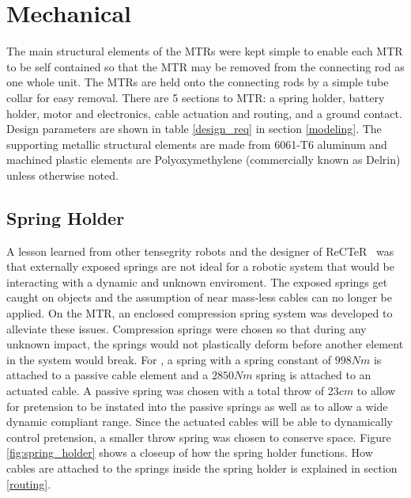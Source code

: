 \section{Mechanical}
The main structural elements of the MTRs were kept simple to  enable  each  MTR  to  be self  contained  so  that  the  MTR  may be removed from the connecting rod as one whole unit.
The MTRs  are  held  onto  the  connecting  rods  by  a  simple tube  collar  for  easy  removal. 
There  are  5  sections  to MTR: a spring holder, battery holder, motor and electronics, cable actuation and routing, and a ground contact. 
Design parameters are shown in table \ref{design_req} in section \ref{modeling}.
The supporting metallic structural elements are made from 6061-T6 aluminum and machined plastic elements are Polyoxymethylene (commercially known as Delrin) unless otherwise noted.

\subsection{Spring Holder}
A  lesson  learned  from other tensegrity robots and the designer of ReCTeR~\cite{Caluwaerts2013rsif} was  that  externally  exposed springs are not ideal for a robotic system that would be interacting with a dynamic and unknown enviroment. 
The exposed springs get caught on objects and the assumption of near mass-less cables  can  no  longer  be  applied.  
On  the  MTR, an enclosed compression spring system was developed  to  alleviate  these  issues.  
Compression  springs were chosen so that during any unknown impact, the springs would not plastically deform before another element in the system would break. 
For \SB{}, a spring with a spring constant of \(998 Nm\) is attached to a passive cable element  and  a \(2850 Nm\) spring  is  attached  to  an  actuated cable.  
A  passive  spring was chosen with a total throw of \(23 cm\) to allow for pretension to be instated into the passive springs as well as to allow a wide dynamic compliant range.  
Since the actuated cables will be able to dynamically control pretension, a smaller throw spring was chosen to conserve space.
Figure \ref{fig:spring_holder} shows a closeup of how the spring holder functions.
How cables are attached to the springs inside the spring holder is explained in section \ref{routing}.

